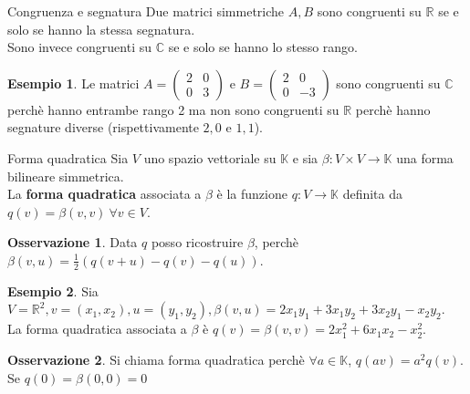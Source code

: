 \documentclass[a4paper]{article}
\theoremstyle{definition}
\newtheorem*{oss}{Osservazione}
\newtheorem*{es}{Esempio}
\begin{document}
	\begin{cor}{Congruenza e segnatura}{}
		Due matrici simmetriche $A, B$ sono congruenti su $\mathbb{R}$ se e solo se hanno la stessa segnatura. \\
		Sono invece congruenti su $\mathbb{C}$ se e solo se hanno lo stesso rango.
	\end{cor}

	\begin{es}
		Le matrici $A = \begin{pmatrix}
			2 & 0 \\
			0 & 3
		\end{pmatrix}$ e $B = \begin{pmatrix}
			2 & 0 \\
			0 & -3
		\end{pmatrix}$ sono congruenti su $\mathbb{C}$ perchè hanno entrambe rango 2
		ma non sono congruenti su $\mathbb{R}$ perchè hanno segnature diverse (rispettivamente $2, 0$ e $1, 1$).
	\end{es}
	
	\begin{deff}{Forma quadratica}{}
		Sia $V$ uno spazio vettoriale su $\mathbb{K}$ e sia $\beta: V \times V \to \mathbb{K}$ una forma bilineare simmetrica. \\
		La \textbf{forma quadratica} associata a $\beta$ è la funzione $q: V \to \mathbb{K}$ definita da $q(v) = \beta(v, v) \ \forall v \in V$.
	\end{deff}
	\begin{oss}
		Data $q$ posso ricostruire $\beta$, perchè $\beta(v, u) = \frac{1}{2}(q(v + u) - q(v) - q(u))$.
	\end{oss}

	\begin{es}
		Sia $V = \mathbb{R}^2, v = (x_1, x_2), u = (y_1, y_2), \beta(v, u) = 2x_1y_1 + 3x_1y_2 + 3x_2y_1 - x_2y_2$. \\
		La forma quadratica associata a $\beta$ è $q(v) = \beta(v, v) = 2x_1^2 + 6x_1x_2 - x_2^2$.
	\end{es}

	\begin{oss}
		Si chiama forma quadratica perchè $\forall a \in \mathbb{K}$, $q(av) = a^2q(v)$.
		Se $q(0) = \beta(0, 0) = 0$
	\end{oss}
\end{document}
